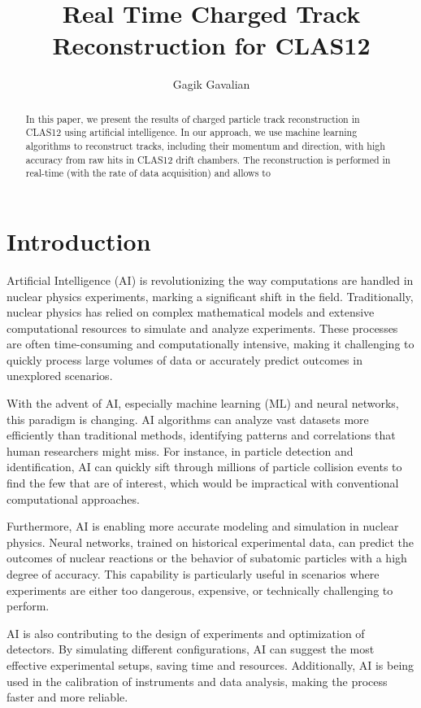 \documentclass[preprint,12pt]{elsarticle}
\title{Real Time Charged Track Reconstruction for CLAS12}
\author[1]{Gagik Gavalian}
\begin{document}
\begin{abstract}
In this paper, we present the results of charged particle track reconstruction in CLAS12 using artificial intelligence. In our approach, we 
use machine learning algorithms to reconstruct tracks, including their momentum and direction, with high accuracy from raw hits in CLAS12
drift chambers. The reconstruction is performed in real-time (with the rate of data acquisition) and allows to 

\end{abstract}
\maketitle


\section{Introduction}
\indent
Artificial Intelligence (AI) is revolutionizing the way computations are handled in nuclear physics experiments, marking a significant shift in the field. Traditionally, nuclear physics has relied on complex mathematical models and extensive computational resources to simulate and analyze experiments. These processes are often time-consuming and computationally intensive, making it challenging to quickly process large volumes of data or accurately predict outcomes in unexplored scenarios.

With the advent of AI, especially machine learning (ML) and neural networks, this paradigm is changing. AI algorithms can analyze vast datasets more efficiently than traditional methods, identifying patterns and correlations that human researchers might miss. For instance, in particle detection and identification, AI can quickly sift through millions of particle collision events to find the few that are of interest, which would be impractical with conventional computational approaches.

Furthermore, AI is enabling more accurate modeling and simulation in nuclear physics. Neural networks, trained on historical experimental data, can predict the outcomes of nuclear reactions or the behavior of subatomic particles with a high degree of accuracy. This capability is particularly useful in scenarios where experiments are either too dangerous, expensive, or technically challenging to perform.

AI is also contributing to the design of experiments and optimization of detectors. By simulating different configurations, AI can suggest the most effective experimental setups, saving time and resources. Additionally, AI is being used in the calibration of instruments and data analysis, making the process faster and more reliable.
\end{document}
